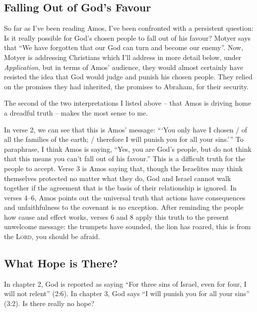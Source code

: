 \subsection{Falling Out of God's Favour}

So far as I've been reading Amos, I've been confronted with a persistent
question: Is it really possible for God's chosen people to fall out of his
favour? Motyer says that \enquote{We have forgotten that our God can turn and
become our enemy}\autocite[79]{motyer:2011}. Now, Motyer is addressing
Christians which I'll address in more detail below, under \textit{Application},
but in terms of Amos' audience, they would almost certainly have resisted the
idea that God would judge and punish his chosen people. They relied on the
promises they had inherited, the promises to Abraham, for their security.

The second of the two interpretations I listed above -- that Amos is driving
home a dreadful truth -- makes the most sense to me.

In verse 2, we can see that this is Amos' message: \enquote{\enquote{You only
have I chosen / of all the families of the earth; / therefore I will punish you
for all your sins.}} To paraphrase, I think Amos is saying, \enquote{Yes, you
are God's people, but do not think that this means you can't fall out of his
favour.} This is a difficult truth for the people to accept. Verse 3 is Amos
saying that, though the Israelites may think themselves protected no matter what
they do, God and Israel cannot walk together if the agreement that is the basis
of their relationship is ignored. In verses 4--6, Amos points out the universal
truth that actions have consequences and unfaithfulness to the covenant is no
exception. After reminding the people how cause and effect works, verses  6 and
8 apply this truth to the present unwelcome message: the trumpets have sounded,
the lion has roared, this is from the \textsc{Lord}, you should be afraid.

\subsection{What Hope is There?}

In chapter 2, God is reported as saying \enquote{For three sins of Israel, even
for four, I will not relent} (2:6). In chapter 3, God says \enquote{I will
punish you for all your sins} (3:2). Is there really no hope?

